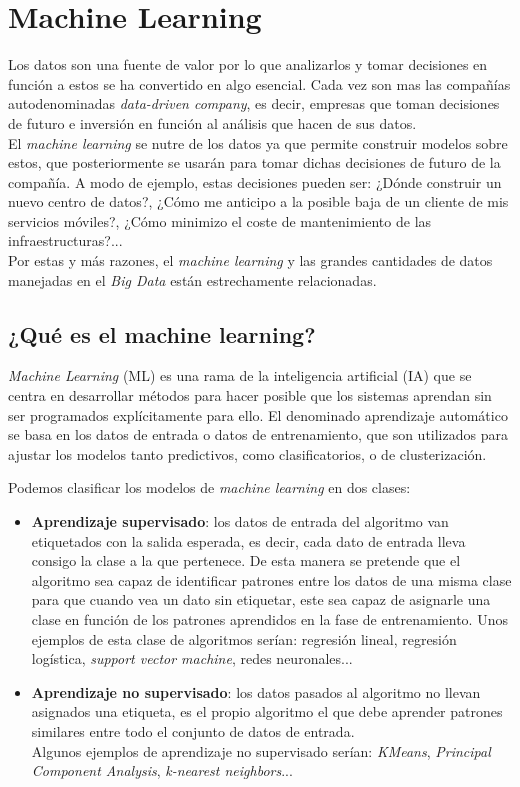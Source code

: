 \chapter{Machine Learning}
Los datos son una fuente de valor por lo que analizarlos y tomar decisiones en función a estos se ha
convertido en algo esencial. Cada vez son mas las compañías autodenominadas 
\textit{data-driven company}, es decir, empresas que toman decisiones de 
futuro e inversión en función al análisis que hacen de sus datos.\\
El \textit{machine learning} se nutre de los datos ya que permite construir modelos sobre estos,
que posteriormente se usarán para tomar dichas decisiones de futuro de la compañía. A modo de ejemplo, estas
decisiones pueden ser: ¿Dónde construir un nuevo centro de datos?, ¿Cómo me anticipo a la posible baja de un
cliente de mis servicios móviles?, ¿Cómo minimizo el coste de mantenimiento de las infraestructuras?...\\
Por estas y más razones, el \textit{machine learning} y las grandes cantidades de datos manejadas en el 
\textit{Big Data} están estrechamente relacionadas.

\section{¿Qué es el machine learning?}
\textit{Machine Learning} (ML) es una rama de la inteligencia artificial (IA) 
que se centra en desarrollar métodos para hacer posible que los sistemas aprendan sin ser programados 
explícitamente para ello.
El denominado aprendizaje automático se basa en los datos de entrada o datos de entrenamiento, que
son utilizados para ajustar los modelos tanto predictivos, como clasificatorios, o de clusterización.

Podemos clasificar los modelos de \textit{machine learning} en dos clases:
\begin{itemize}
  \item \textbf{Aprendizaje supervisado}: los datos de entrada del 
  algoritmo van etiquetados con la salida esperada, es decir, cada dato de entrada lleva consigo 
  la clase a la que pertenece. De esta manera se pretende que el algoritmo sea capaz de identificar 
  patrones entre los datos de una misma clase para que cuando vea un dato sin etiquetar, este sea 
  capaz de asignarle una clase en función de los patrones aprendidos en la fase de entrenamiento.
  Unos ejemplos de esta clase de algoritmos serían: regresión lineal, regresión logística, 
  \textit{support vector machine}, redes neuronales...
  
  \item \textbf{Aprendizaje no supervisado}: los datos pasados 
  al algoritmo no llevan asignados una etiqueta, es el propio algoritmo el que debe aprender 
  patrones similares entre todo el conjunto de datos de entrada.\\
  Algunos ejemplos de aprendizaje no supervisado serían: \textit{KMeans}, \textit{Principal Component Analysis}, 
  \textit{k-nearest neighbors}...
\end{itemize}

